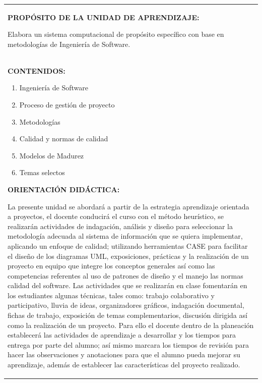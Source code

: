 \documentclass[10pt]{article}
\begin{document}
  \begin{longtable}{|p{}|}
    \hline
    \textbf{PROPÓSITO DE LA UNIDAD DE APRENDIZAJE:}

    Elabora un sistema computacional de propósito específico con base en metodologías de Ingeniería de Software. \\

    \textbf{CONTENIDOS:}
    \begin{enumerate}[I]
    \setlength{\itemsep}{0pt}
    \setlength{\parskip}{0pt}
    \item Ingeniería de Software
\item Proceso de gestión de proyecto
\item Metodologías
\item Calidad y normas de calidad
\item Modelos de Madurez
\item Temas selectos

    \end{enumerate}

    \textbf{ORIENTACIÓN DIDÁCTICA:}

    La presente unidad se abordará a partir de la estrategia aprendizaje orientada a proyectos, el docente conducirá el curso con el método heurístico, se realizarán actividades de indagación, análisis y diseño para seleccionar la metodología adecuada al sistema de información que se quiera implementar, aplicando un enfoque de calidad; utilizando herramientas CASE para facilitar el diseño de los diagramas UML, exposiciones, prácticas y la realización de un proyecto en equipo que integre los conceptos generales así como las competencias referentes al uso de patrones de diseño y el manejo las normas calidad del software.
Las actividades que se realizarán en clase fomentarán en los estudiantes algunas técnicas, tales como: trabajo colaborativo y participativo, lluvia de ideas, organizadores gráficos, indagación documental, fichas de trabajo, exposición de temas complementarios, discusión dirigida así como la realización de un proyecto.
Para ello el docente dentro de la planeación establecerá las actividades de aprendizaje a desarrollar y los tiempos para entrega por parte del alumno; así mismo marcara los tiempos de revisión para hacer las observaciones y anotaciones para que el alumno pueda mejorar su aprendizaje, además de establecer las características del proyecto realizado. \\ 


\end{longtable}
\end{document}
